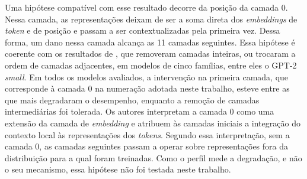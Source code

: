 Uma hipótese compatível com esse resultado decorre da posição da camada 0. Nessa camada, as
representações deixam de ser a soma direta dos \textit{embeddings} de \textit{token} e de
posição e passam a ser contextualizadas pela primeira vez. Dessa forma, um dano nessa camada
alcança as 11 camadas seguintes. Essa hipótese é coerente com os resultados de
, que removeram camadas inteiras, ou trocaram a ordem de camadas
adjacentes, em modelos de cinco famílias, entre eles o GPT-2 \textit{small}. Em todos os
modelos avaliados, a intervenção na primeira camada, que corresponde à camada 0 na numeração
adotada neste trabalho, esteve entre as que mais degradaram o desempenho, enquanto a remoção de
camadas intermediárias foi tolerada. Os autores interpretam a camada 0 como uma extensão da
camada de \textit{embedding} e atribuem às camadas iniciais a integração do contexto local às
representações dos \textit{tokens}. Segundo essa interpretação, sem a camada 0, as camadas
seguintes passam a operar sobre representações fora da distribuição para a qual foram
treinadas. Como o perfil mede a degradação, e não o seu
mecanismo, essa hipótese não foi testada neste trabalho.

